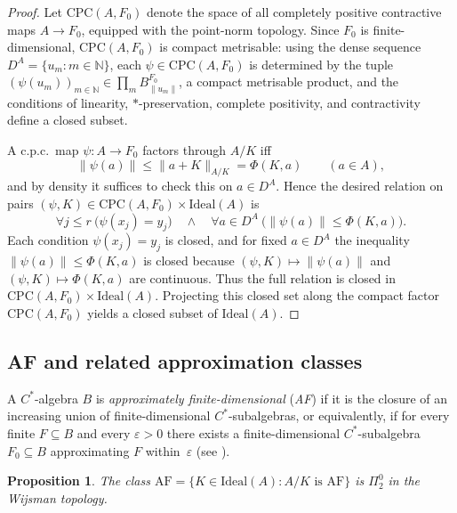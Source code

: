 \documentclass[12pt,fleqn,a4paper]{amsart}
\renewcommand{\le}{\leqslant}
\numberwithin{equation}{section}
\newtheorem{proposition}[theorem]{Proposition}
\theoremstyle{definition}
\newcommand{\N}{\mathbb{N}}
\newcommand{\Ideal}{\mathrm{Ideal}}
\begin{document}
\begin{proof}
Let $\mathrm{CPC}(A,F_0)$ denote the space of all completely positive contractive
maps $A\to F_0$, equipped with the point-norm topology.
Since $F_0$ is finite-dimensional, $\mathrm{CPC}(A,F_0)$ is compact metrisable:
using the dense sequence $D^A=\{u_m:m\in\N\}$, each
$\psi\in\mathrm{CPC}(A,F_0)$ is determined by the tuple
$(\psi(u_m))_{m\in\N}\in \prod_m B_{\|u_m\|}^{F_0}$, a compact metrisable product,
and the conditions of linearity, $*$-preservation, complete positivity, and
contractivity define a closed subset.

A c.p.c.\ map $\psi:A\to F_0$ factors through $A/K$ iff
\[
\|\psi(a)\| \le \|a+K\|_{A/K}=\Phi(K,a)\qquad(a\in A),
\]
and by density it suffices to check this on $a\in D^A$.
Hence the desired relation on pairs $(\psi,K)\in\mathrm{CPC}(A,F_0)\times\Ideal(A)$ is
\[
\forall j\le r\ \bigl(\psi(x_j)=y_j\bigr)
\quad\wedge\quad
\forall a\in D^A\ \bigl(\|\psi(a)\|\le \Phi(K,a)\bigr).
\]
Each condition $\psi(x_j)=y_j$ is closed, and for fixed $a\in D^A$ the inequality
$\|\psi(a)\|\le \Phi(K,a)$ is closed because $(\psi,K)\mapsto \|\psi(a)\|$ and
$(\psi,K)\mapsto\Phi(K,a)$ are continuous.
Thus the full relation is closed in
$\mathrm{CPC}(A,F_0)\times\Ideal(A)$.
Projecting this closed set along the compact factor $\mathrm{CPC}(A,F_0)$ yields a
closed subset of $\Ideal(A)$.
\end{proof}

\subsection{AF and related approximation classes}

A $C^*$-algebra $B$ is \emph{approximately finite-dimensional} (\emph{AF}) if it is the
closure of an increasing union of finite-dimensional $C^*$-subalgebras, or
equivalently, if for every finite $F\subseteq B$ and every $\varepsilon>0$ there exists
a finite-dimensional $C^*$-subalgebra $F_0\subseteq B$ approximating $F$
within~$\varepsilon$ (see \cite[II.8.2.2]{BlackadarOA}).

\begin{proposition}\label{prop:AF}
The class $\mathrm{AF}=\{K\in\Ideal(A):A/K\text{ is AF}\}$ is $\Pi^0_2$ in the Wijsman
topology.
\end{proposition}
\end{document}
